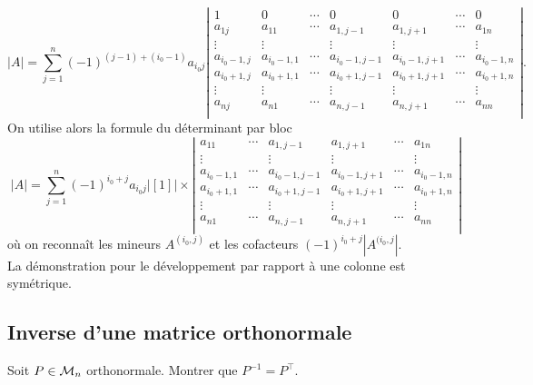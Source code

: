 {  $$
  |A| = \sum_{j=1}^n (-1)^{(j-1) + (i_0-1)} a_{i_0j} 
    \left|\begin{array}{ccccccc}
      1 & 0 & \cdots & 0 & 0 & \cdots & 0 \\
      a_{1j} & a_{11} & \cdots & a_{1,j-1} & a_{1,j+1} & \cdots & a_{1n} \\
      \vdots & \vdots & & \vdots & \vdots & & \vdots \\
      a_{i_0-1, j} & a_{i_0-1, 1} & \cdots & a_{i_0-1,j-1} & a_{i_0-1, j+1} & \cdots & a_{i_0-1, n} \\
      a_{i_0+1, j} & a_{i_0+1, 1} & \cdots & a_{i_0+1, j-1} & a_{i_0+1, j+1} & \cdots & a_{i_0+1, n} \\
      \vdots & \vdots & & \vdots & \vdots & & \vdots\\
      a_{nj} & a_{n1} & \cdots & a_{n,j-1} & a_{n,j+1} & \cdots & a_{nn} \\
    \end{array}\right|.
  $$
  On utilise alors la formule du déterminant par bloc
  $$
  |A| = \sum_{j=1}^n (-1)^{i_0 + j} a_{i_0j} |[1]| \times
    \left|\begin{array}{cccccc}
      a_{11} & \cdots & a_{1,j-1} & a_{1,j+1} & \cdots & a_{1n} \\
      \vdots & & \vdots & \vdots & & \vdots \\
      a_{i_0-1, 1} & \cdots & a_{i_0-1,j-1} & a_{i_0-1, j+1} & \cdots & a_{i_0-1, n} \\
      a_{i_0+1, 1} & \cdots & a_{i_0+1, j-1} & a_{i_0+1, j+1} & \cdots & a_{i_0+1, n} \\
      \vdots & & \vdots & \vdots & & \vdots\\
      a_{n1} & \cdots & a_{n,j-1} & a_{n,j+1} & \cdots & a_{nn} \\
    \end{array}\right|
  $$
  où on reconnaît les mineurs $A^{(i_0, j)}$ et les cofacteurs $(-1)^{i_0 + j} |A^{(i_0, j}|$. \\
  La démonstration pour le développement par rapport à une colonne est symétrique.
}
 
\subsection{Inverse d'une matrice orthonormale}%

\begin{exercise} \label{exo:AlgLin-Trace}
  Soit $P \in \mathcal{M}_n$ orthonormale. Montrer que $P^{-1} = P^\top$.
\end{exercise}

